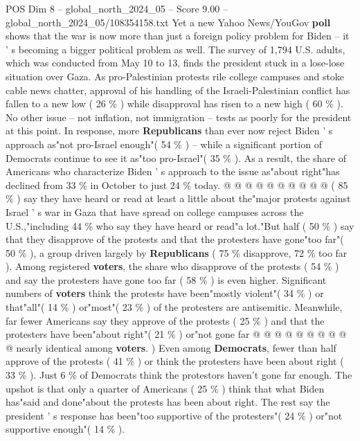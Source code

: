 \begin{textsample}{POS Dim 8 – global\_north\_2024\_05 – Score 9.00 – global\_north\_2024\_05/108354158.txt}  \label{ex:f8_pos_079}
Yet a new Yahoo News/YouGov \textbf{poll} shows that the war is now more than just a foreign policy problem for Biden -- it ' s becoming a bigger political problem as well.
The survey of 1,794 U.S. adults, which was conducted from May 10 to 13, finds the president stuck in a lose-lose situation over Gaza.
As pro-Palestinian protests rile college campuses and stoke cable news chatter, approval of his handling of the Israeli-Palestinian conflict has fallen to a new low ( 26 \% ) while disapproval has risen to a new high ( 60 \% ).
No other issue -- not inflation, not immigration -- tests as poorly for the president at this point.
In response, more \textbf{Republicans} than ever now reject Biden ' s approach as"not pro-Israel enough"( 54 \% ) -- while a significant portion of Democrats continue to see it as"too pro-Israel"( 35 \% ).
As a result, the share of Americans who characterize Biden ' s approach to the issue as"about right"has declined from 33 \% in October to just 24 \% today. @ @ @ @ @ @ @ @ @ @ ( 85 \% ) say they have heard or read at least a little about the"major protests against Israel ' s war in Gaza that have spread on college campuses across the U.S.,"including 44 \% who say they have heard or read"a lot."But half ( 50 \% ) say that they disapprove of the protests and that the protesters have gone"too far"( 50 \% ), a group driven largely by \textbf{Republicans} ( 75 \% disapprove, 72 \% too far ).
Among registered \textbf{voters}, the share who disapprove of the protests ( 54 \% ) and say the protesters have gone too far ( 58 \% ) is even higher.
Significant numbers of \textbf{voters} think the protests have been"mostly violent"( 34 \% ) or that"all"( 14 \% ) or"most"( 23 \% ) of the protesters are antisemitic.
Meanwhile, far fewer Americans say they approve of the protests ( 25 \% ) and that the protesters have been"about right"( 21 \% ) or"not gone far @ @ @ @ @ @ @ @ @ @ nearly identical among \textbf{voters}. ) Even among \textbf{Democrats}, fewer than half approve of the protests ( 41 \% ) or think the protesters have been about right ( 33 \% ).
Just 6 \% of Democrats think the protestors haven't gone far enough.
The upshot is that only a quarter of Americans ( 25 \% ) think that what Biden has"said and done"about the protests has been about right.
The rest say the president ' s response has been"too supportive of the protesters"( 24 \% ) or"not supportive enough"( 14 \% ).

\end{textsample}
